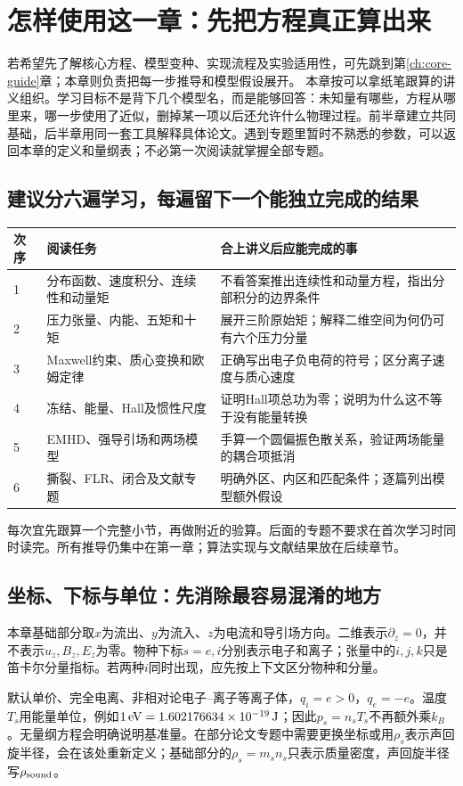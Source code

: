 \section{怎样使用这一章：先把方程真正算出来}
\label{sec:tutorial-start}
若希望先了解核心方程、模型变种、实现流程及实验适用性，可先跳到第\ref{ch:core-guide}章；本章则负责把每一步推导和模型假设展开。
本章按可以拿纸笔跟算的讲义组织。学习目标不是背下几个模型名，而是能够回答：未知量有哪些，方程从哪里来，哪一步使用了近似，删掉某一项以后还允许什么物理过程。前半章建立共同基础，后半章用同一套工具解释具体论文。遇到专题里暂时不熟悉的参数，可以返回本章的定义和量纲表；不必第一次阅读就掌握全部专题。

\subsection{建议分六遍学习，每遍留下一个能独立完成的结果}
\begin{longtable}{P{14mm}P{66mm}P{69mm}}
\toprule 次序 & 阅读任务 & 合上讲义后应能完成的事\\ & 分布函数、速度积分、连续性和动量矩 & 不看答案推出连续性和动量方程，指出分部积分的边界条件\\
2 & 压力张量、内能、五矩和十矩 & 展开三阶原始矩；解释二维空间为何仍可有六个压力分量\\
3 & Maxwell约束、质心变换和欧姆定律 & 正确写出电子负电荷的符号；区分离子速度与质心速度\\
4 & 冻结、能量、Hall及惯性尺度 & 证明Hall项总功为零；说明为什么这不等于没有能量转换\\
5 & EMHD、强导引场和两场模型 & 手算一个圆偏振色散关系，验证两场能量的耦合项抵消\\
6 & 撕裂、FLR、闭合及文献专题 & 明确外区、内区和匹配条件；逐篇列出模型额外假设\\\bottomrule
\end{longtable}
每次宜先跟算一个完整小节，再做附近的验算。后面的专题不要求在首次学习时同时读完。所有推导仍集中在第一章；算法实现与文献结果放在后续章节。

\subsection{坐标、下标与单位：先消除最容易混淆的地方}
本章基础部分取$x$为流出、$y$为流入、$z$为电流和导引场方向。二维表示$\partial_z=0$，并不表示$u_z,B_z,E_z$为零。物种下标$s=e,i$分别表示电子和离子；张量中的$i,j,k$只是笛卡尔分量指标。若两种$i$同时出现，应先按上下文区分物种和分量。

默认单价、完全电离、非相对论电子--离子等离子体，$q_i=e>0$，$q_e=-e$。温度$T_s$用能量单位，例如$1\,{\rm eV}=1.602176634\times10^{-19}\,{\rm J}$；因此$p_s=n_sT_s$不再额外乘$k_B$。无量纲方程会明确说明基准量。在部分论文专题中需要更换坐标或用$\rho_s$表示声回旋半径，会在该处重新定义；基础部分的$\rho_s=m_sn_s$只表示质量密度，声回旋半径写$\rho_{\rm sound}$。

